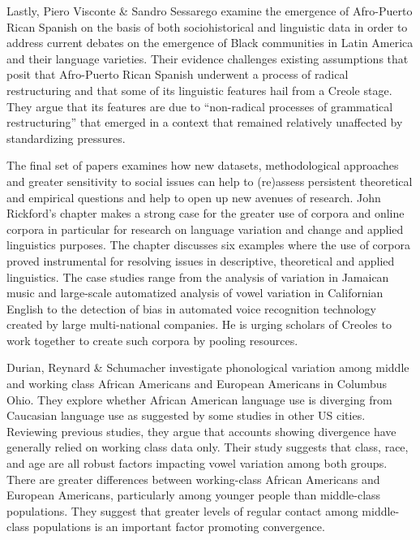 \documentclass[output=paper, colorlinks,citecolor=brown]{langscibook}
\begin{document}
Lastly, Piero Visconte \& Sandro Sessarego examine the emergence of Afro-Puerto Rican Spanish on the basis of both sociohistorical and linguistic data in order to address current debates on the emergence of Black communities in Latin America and their language varieties. Their evidence challenges existing assumptions that posit that Afro-Puerto Rican Spanish underwent a process of radical restructuring and that some of its linguistic features hail from a Creole stage. They argue that its features are due to “non-radical processes of grammatical restructuring” that emerged in a context that remained relatively unaffected by standardizing pressures. 

\begin{sloppypar}
The final set of  papers examines how new datasets, methodological approaches and greater sensitivity to social issues can help to (re)assess persistent theoretical and empirical questions and help to open up new avenues of research. John Rickford’s chapter makes a strong case for the greater use of corpora and online corpora in particular for research on language variation and change and applied linguistics purposes. The chapter discusses six examples where the use of corpora proved instrumental for resolving issues in descriptive, theoretical and applied linguistics. The case studies range from the analysis of variation in Jamaican music and large-scale automatized analysis of vowel variation in Californian English to the detection of bias in automated voice recognition technology created by large multi-national companies. He is urging scholars of Creoles to work together to create such corpora by pooling resources. 

Durian, Reynard \& Schumacher investigate phonological variation among middle and working class African Americans and European Americans in Columbus Ohio. They explore whether African American language use is diverging from Caucasian language use as suggested by some studies in other US cities. Reviewing previous studies, they argue that accounts showing divergence have generally relied on working class data only. Their study suggests that class, race, and age are all robust factors impacting vowel variation among both groups.  There are greater differences between working-class African Americans and European Americans, particularly among younger people than middle-class populations. They suggest that greater levels of regular contact among middle-class populations is an important factor promoting convergence.
\end{sloppypar}
\end{document}
